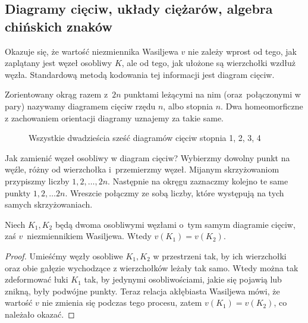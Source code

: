 
\subsection{Diagramy cięciw, układy ciężarów, algebra chińskich znaków}

Okazuje się, że wartość niezmiennika Wasiljewa $v$ nie zależy wprost od tego, jak zaplątany jest węzeł osobliwy $K$, ale od tego, jak ułożone są wierzchołki wzdłuż węzła.
Standardową metodą kodowania tej informacji jest diagram cięciw.

\begin{definition}
%
    Zorientowany okrąg razem z~$2n$ punktami leżącymi na nim (oraz~połączonymi w pary) nazywamy diagramem cięciw rzędu $n$, albo stopnia $n$.
    Dwa homeomorficzne z zachowaniem orientacji diagramy uznajemy za takie same.
\end{definition}

\vspace{-15pt}

\begin{figure}[H]
    \centering
\begin{comment}

\end{comment}
    \caption{Wszystkie dwadzieścia sześć diagramów cięciw stopnia 1, 2, 3, 4}
\end{figure}

Jak zamienić węzeł osobliwy w diagram cięciw?
Wybierzmy dowolny punkt na węźle, różny od wierzchołka i~przemierzmy węzeł.
Mijanym skrzyżowaniom przypiszmy liczby $1, 2, \ldots, 2n$.
Następnie na okręgu zaznaczmy kolejno te same punkty $1, 2, \ldots 2n$.
Wreszcie połączmy ze sobą liczby, które występują na tych samych skrzyżowaniach.


\begin{proposition}
    Niech $K_1, K_2$ będą dwoma osobliwymi węzłami o~tym samym diagramie cięciw, zaś $v$~niezmiennikiem Wasiljewa.
    Wtedy $v(K_1) = v(K_2)$.
\end{proposition}

\begin{proof}
    Umieśćmy węzły osobliwe $K_1, K_2$ w przestrzeni tak, by ich wierzchołki oraz obie gałęzie wychodzące z wierzchołków leżały tak samo. Wtedy można tak zdeformować łuki $K_1$ tak, by jedynymi osobliwościami, jakie się pojawią lub znikną, były podwójne punkty.
    Teraz relacja akłębiasta Wasiljewa mówi, że wartość $v$ nie zmienia się podczas tego procesu, zatem $v(K_1) = v(K_2)$, co należało okazać.
\end{proof}

